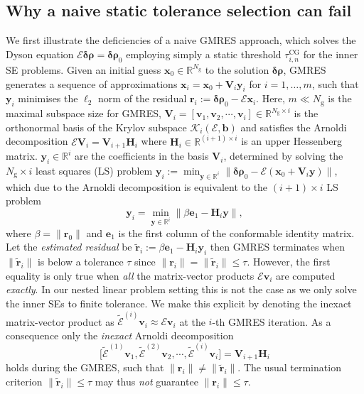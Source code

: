 \documentclass[hidelinks,onefignum,onetabnum]{siamart250211}
\newcommand{\R}{\mathbb{R}}
\newcommand{\Ng}{N_{\mathrm{g}}}
\newcommand{\taucg}{\tau^{\mathrm{CG}}}
\begin{document}
\subsection{Why a naive static tolerance selection can fail}
\label{sec:gmres_fail}
%
We first illustrate the deficiencies of a naive GMRES approach,
which solves the Dyson equation $\bm{\mathcal E} \bm{\delta \rho} = \bm{\delta \rho}_0$
%
%
employing simply a static threshold $\taucg_{i,n}$ for the inner SE problems.
%
Given an initial guess $\bm x_0 \in \R^{\Ng}$ to the solution $\bm{\delta \rho}$,
GMRES generates a sequence of approximations $\bm x_i = \bm x_0 + \bm V_i \bm y_i$ for $i = 1, \ldots, m$,
such that $\bm y_i$ minimises the $\ell_2$ norm of the
residual \mbox{$\bm r_i := \bm{\delta \rho}_0 - \bm{\mathcal E} \bm x_i$}.
%
Here, $m \ll \Ng$ is the maximal subspace size for GMRES,
$\bm V_i = \left[ \bm v_1, \bm v_2, \cdots, \bm v_i \right] \in \R^{\Ng \times i}$ is the
orthonormal basis of the Krylov subspace $\mathcal{K}_i(\bm{\mathcal E}, \bm
b)$ and satisfies the Arnoldi decomposition
$\bm{\mathcal E} \bm V_i = \bm V_{i+1} \bm H_i$
where $\bm H_i \in \R^{(i+1) \times i}$ is an upper Hessenberg matrix.
$\bm y_i \in \R^i$ are the coefficients in the basis $\bm V_i$,
determined by solving the $\Ng \times i$ least squares (LS) problem 
$\bm y_i := \min_{\bm y \in \R^i} \| \bm{\delta \rho}_0 - \bm{\mathcal E} (\bm x_0 + \bm V_i \bm y) \|$,
which due to the Arnoldi decomposition
is equivalent to the $(i+1) \times i$ LS problem
\begin{equation}\label{eq:small_ls}
  \bm y_i = \min_{\bm y \in \R^i} \| \beta \bm e_1 - \bm H_i \bm y \|,
\end{equation}
where $\beta = \| \bm r_0 \|$ and $\bm e_1$ is the first column of the
conformable identity matrix. Let the \emph{estimated residual} be $\widetilde{\bm r}_i := \beta \bm e_1 - \bm H_i \bm y_i$ then GMRES terminates when $\|\widetilde{\bm r}_i\|$ is below a tolerance $\tau$ since $\| \bm r_i \| = \|
\widetilde{\bm r}_i \| \leq \tau$.
However, the first equality is only true when \emph{all} the
matrix-vector products $\bm{\mathcal E} \bm v_i$ are computed \emph{exactly}.
In our nested linear problem setting this is not the case as we only solve
the inner SEs to finite tolerance. We make this explicit by denoting
the inexact matrix-vector product as
$\widetilde{\bm{\mathcal E}}^{(i)} \bm v_i \approx \bm{\mathcal E} \bm v_i$ at the $i$-th GMRES iteration.
As a consequence only the \emph{inexact} Arnoldi decomposition
\begin{equation}\label{eq:inexact_arnoldi_decomposition}
    \big[ \widetilde{\bm{\mathcal E}}^{(1)} \bm v_1, \widetilde{\bm{\mathcal E}}^{(2)} \bm v_2, \cdots, \widetilde{\bm{\mathcal E}}^{(i)} \bm v_i \big] = \bm V_{i+1} \bm H_i
\end{equation}
holds during the GMRES, such that $\| \bm r_i \| \neq \| \widetilde{\bm r}_i \|$.
The usual termination criterion $\| \widetilde{\bm r}_i \| \leq \tau$ may thus \emph{not} guarantee $\| \bm r_i \| \leq \tau$.
\end{document}
